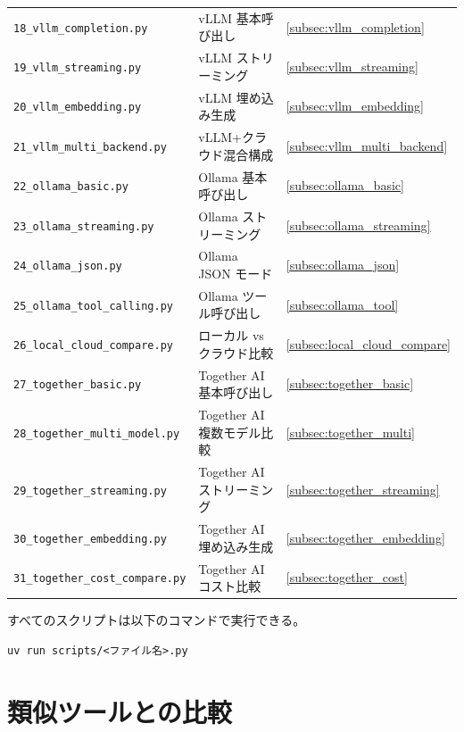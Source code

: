 \documentclass[a4paper,11pt]{ltjsarticle}
\newcommand{\code}[1]{\texttt{#1}}
\begin{document}
\begin{longtable}{lp{7cm}l}
\code{18\_vllm\_completion.py}   & vLLM 基本呼び出し            & \ref{subsec:vllm_completion} \\
\code{19\_vllm\_streaming.py}    & vLLM ストリーミング           & \ref{subsec:vllm_streaming} \\
\code{20\_vllm\_embedding.py}    & vLLM 埋め込み生成             & \ref{subsec:vllm_embedding} \\
\code{21\_vllm\_multi\_backend.py} & vLLM+クラウド混合構成        & \ref{subsec:vllm_multi_backend} \\
\code{22\_ollama\_basic.py}        & Ollama 基本呼び出し          & \ref{subsec:ollama_basic} \\
\code{23\_ollama\_streaming.py}    & Ollama ストリーミング         & \ref{subsec:ollama_streaming} \\
\code{24\_ollama\_json.py}         & Ollama JSON モード           & \ref{subsec:ollama_json} \\
\code{25\_ollama\_tool\_calling.py} & Ollama ツール呼び出し        & \ref{subsec:ollama_tool} \\
\code{26\_local\_cloud\_compare.py} & ローカル vs クラウド比較      & \ref{subsec:local_cloud_compare} \\
\code{27\_together\_basic.py}      & Together AI 基本呼び出し     & \ref{subsec:together_basic} \\
\code{28\_together\_multi\_model.py} & Together AI 複数モデル比較  & \ref{subsec:together_multi} \\
\code{29\_together\_streaming.py}  & Together AI ストリーミング    & \ref{subsec:together_streaming} \\
\code{30\_together\_embedding.py}  & Together AI 埋め込み生成      & \ref{subsec:together_embedding} \\
\code{31\_together\_cost\_compare.py} & Together AI コスト比較      & \ref{subsec:together_cost} \\
\bottomrule
\end{longtable}

すべてのスクリプトは以下のコマンドで実行できる。

\begin{lstlisting}[style=bash]
uv run scripts/<ファイル名>.py
\end{lstlisting}


\section{類似ツールとの比較}
\label{sec:comparison}
\end{document}
